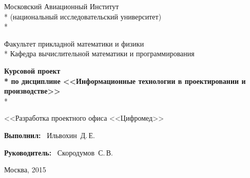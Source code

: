 \begin{titlepage}

\newpage

\begin{center}
Московский Авиационный Институт \\*
(национальный исследовательский университет) \\*

\vspace{2em}

Факультет прикладной математики и физики \\*
Кафедра вычислительной математики и программирования

\vspace{10em}

\Large \textbf{Курсовой проект \\*
по дисциплине <<Информационные технологии в проектировании и производстве>>} \\*

\vspace{3em}

<<Разработка проектного офиса <<Цифромед>>
\end{center}

\vspace{8em}

\hspace{25em}\vbox{
  \hbox{\bfseries{Выполнил:}}
  \hbox{\hspace{1em} Ильвохин Д.\,Е.}
}

\vspace{2em}

\hspace{25em}\vbox{
  \hbox{\bfseries{Руководитель:}}
  \hbox{\hspace{1em} Скородумов С.\,В.}
}

\vspace{\fill}

\begin{center}
Москва, 2015
\end{center}

\end{titlepage}
